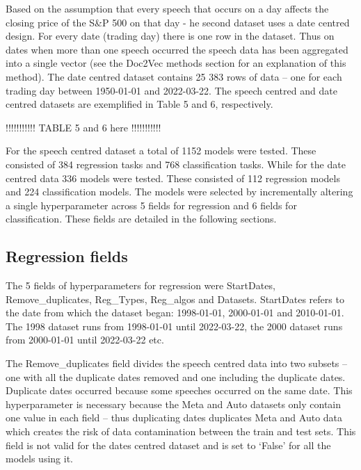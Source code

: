 \documentclass[11pt,preprint, authoryear]{elsarticle}
\numberwithin{equation}{section}
\numberwithin{figure}{section}
\numberwithin{table}{section}
\begin{document}
Based on the assumption that every speech that occurs on a day affects
the closing price of the S\&P 500 on that day - he second dataset uses a
date centred design. For every date (trading day) there is one row in
the dataset. Thus on dates when more than one speech occurred the speech
data has been aggregated into a single vector (see the Doc2Vec methods
section for an explanation of this method). The date centred dataset
contains 25 383 rows of data -- one for each trading day between
1950-01-01 and 2022-03-22. The speech centred and date centred datasets
are exemplified in Table 5 and 6, respectively.

!!!!!!!!!!! TABLE 5 and 6 here !!!!!!!!!!!

For the speech centred dataset a total of 1152 models were tested. These
consisted of 384 regression tasks and 768 classification tasks. While
for the date centred data 336 models were tested. These consisted of 112
regression models and 224 classification models. The models were
selected by incrementally altering a single hyperparameter across 5
fields for regression and 6 fields for classification. These fields are
detailed in the following sections.

\hypertarget{regression-fields}{%
\subsection{Regression fields}\label{regression-fields}}

The 5 fields of hyperparameters for regression were StartDates,
Remove\_duplicates, Reg\_Types, Reg\_algos and Datasets. StartDates
refers to the date from which the dataset began: 1998-01-01, 2000-01-01
and 2010-01-01. The 1998 dataset runs from 1998-01-01 until 2022-03-22,
the 2000 dataset runs from 2000-01-01 until 2022-03-22 etc.

The Remove\_duplicates field divides the speech centred data into two
subsets -- one with all the duplicate dates removed and one including
the duplicate dates. Duplicate dates occurred because some speeches
occurred on the same date. This hyperparameter is necessary because the
Meta and Auto datasets only contain one value in each field -- thus
duplicating dates duplicates Meta and Auto data which creates the risk
of data contamination between the train and test sets. This field is not
valid for the dates centred dataset and is set to `False' for all the
models using it.
\end{document}

